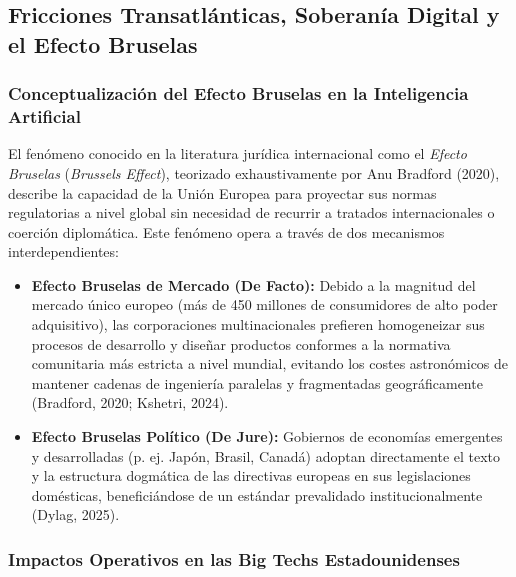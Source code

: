 \subsection{Fricciones Transatlánticas, Soberanía Digital y el Efecto Bruselas}

\subsubsection{Conceptualización del Efecto Bruselas en la Inteligencia Artificial}

El fenómeno conocido en la literatura jurídica internacional como el \textit{Efecto Bruselas} (\textit{Brussels Effect}), teorizado exhaustivamente por Anu Bradford (2020), describe la capacidad de la Unión Europea para proyectar sus normas regulatorias a nivel global sin necesidad de recurrir a tratados internacionales o coerción diplomática. Este fenómeno opera a través de dos mecanismos interdependientes:
\begin{itemize}[leftmargin=2em]
    \item \textbf{Efecto Bruselas de Mercado (De Facto):} Debido a la magnitud del mercado único europeo (más de 450 millones de consumidores de alto poder adquisitivo), las corporaciones multinacionales prefieren homogeneizar sus procesos de desarrollo y diseñar productos conformes a la normativa comunitaria más estricta a nivel mundial, evitando los costes astronómicos de mantener cadenas de ingeniería paralelas y fragmentadas geográficamente (Bradford, 2020; Kshetri, 2024).
    \item \textbf{Efecto Bruselas Político (De Jure):} Gobiernos de economías emergentes y desarrolladas (p. ej. Japón, Brasil, Canadá) adoptan directamente el texto y la estructura dogmática de las directivas europeas en sus legislaciones domésticas, beneficiándose de un estándar prevalidado institucionalmente (Dylag, 2025).
\end{itemize}

\subsubsection{Impactos Operativos en las Big Techs Estadounidenses}

